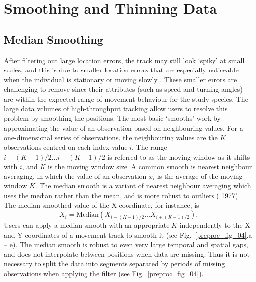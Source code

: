 \section*{Smoothing and Thinning Data}

\subsection*{Median Smoothing}

After filtering out large location errors, the track may still look `spiky' at small scales, and this is due to smaller location errors that are especially noticeable when the individual is stationary or moving slowly \citep{noonan2019}.
These smaller errors are challenging to remove since their attributes (such as speed and turning angles) are within the expected range of movement behaviour for the study species. 
The large data volumes of high-throughput tracking allow users to resolve this problem by smoothing the positions. 
The most basic `smooths' work by approximating the value of an observation based on neighbouring values.
For a one-dimensional series of observations, the neighbouring values are the $K$ observations centred on each index value $i$.
The range ${i - (K-1)/2} \ldots {i + (K-1)/2}$ is referred to as the moving window as it shifts with $i$, and $K$ is the moving window size.
A common smooth is nearest neighbour averaging, in which the value of an observation $x_i$ is the average of the moving window $K$.
The median smooth is a variant of nearest neighbour averaging which uses the median rather than the mean, and is more robust to outliers (\citeauthor{tukey1977} 1977).
The median smoothed value of the X coordinate, for instance, is
%
    $$
        X_i = \text{Median}(X_{i - (K-1)/2} \ldots X_{i + (K-1)/2}).
    $$
Users can apply a median smooth with an appropriate $K$ independently to the X and Y coordinates of a movement track to smooth it (see Fig.~\ref{preproc_fig_04}.a -- e).
The median smooth is robust to even very large temporal and spatial gaps, and does not interpolate between positions when data are missing. 
Thus it is not necessary to split the data into segments separated by periods of missing observations when applying the filter (see Fig.~\ref{preproc_fig_04}).

